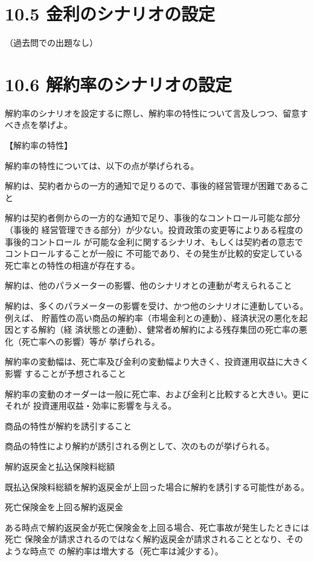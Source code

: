 \documentclass[report,gutter=10mm,fore-edge=10mm,uplatex,dvipdfmx]{jlreq}
\begin{document}
\section{10.5 金利のシナリオの設定}
（過去問での出題なし）

\section{10.6 解約率のシナリオの設定}
解約率のシナリオを設定するに際し、解約率の特性について言及しつつ、留意すべき点を挙げよ。

\answer{}
【解約率の特性】

解約率の特性については、以下の点が挙げられる。

解約は、契約者からの一方的通知で足りるので、事後的経営管理が困難であること

解約は契約者側からの一方的な通知で足り、事後的なコントロール可能な部分（事後的
経営管理できる部分）が少ない。投資政策の変更等によりある程度の事後的コントロール
が可能な金利に関するシナリオ、もしくは契約者の意志でコントロールすることが一般に
不可能であり、その発生が比較的安定している死亡率との特性の相違が存在する。

解約は、他のパラメーターの影響、他のシナリオとの連動が考えられること

解約は、多くのパラメーターの影響を受け、かつ他のシナリオに連動している。例えば、
貯蓄性の高い商品の解約率（市場金利との連動）、経済状況の悪化を起因とする解約（経
済状態との連動）、健常者め解約による残存集団の死亡率の悪化（死亡率への影響）等が
挙げられる。

解約率の変動幅は、死亡率及び金利の変動幅より大きく、投資運用収益に大きく影響
することが予想されること

解約率の変動のオーダーは一般に死亡率、および金利と比較すると大きい。更にそれが
投資運用収益・効率に影響を与える。

商品の特性が解約を誘引すること

商品の特性により解約が誘引される例として、次のものが挙げられる。

解約返戻金と払込保険料総額

既払込保険料総額を解約返戻金が上回った場合に解約を誘引する可能性がある。

死亡保険金を上回る解約返戻金

ある時点で解約返戻金が死亡保険金を上回る場合、死亡事故が発生したときには死亡
保険金が請求されるのではなく解約返戻金が請求されることとなり、そのような時点で
の解約率は増大する（死亡率は減少する）。
\end{document}
